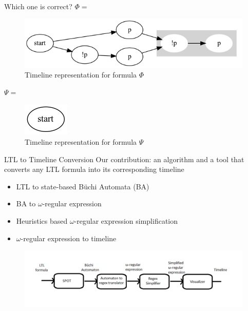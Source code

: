 \documentclass[handout]{beamer}
\newcommand{\Buchi}{B\"{u}chi }
\begin{document}
\begin{frame}{Which one is correct?}
    $\Phi =$
    \begin{figure}
        \centering
        \includegraphics[scale=0.6]{examples/ex2/ex2.gv.png}
        \caption{Timeline representation for formula $\Phi$}
    \end{figure}
    
    $\Psi =$ 
    
   \begin{figure}
        \centering
        \includegraphics[scale=0.6]{examples/ex3/ex3.gv.png}
        \caption{Timeline representation for formula $\Psi$}
    \end{figure}
\end{frame}

\begin{frame}{LTL to Timeline Conversion}
    Our contribution: an algorithm and a tool that converts any LTL formula into its corresponding timeline
    \begin{itemize}
        \item LTL to state-based \Buchi Automata (BA)
        \item BA to $\omega$-regular expression
        \item Heuristics based $\omega$-regular expression simplification
        \item $\omega$-regular expression to timeline
    \end{itemize}
    \begin{figure}
        \centering
        \includegraphics[scale=0.45]{img/algo-flowchart.png}
        \label{fig:my_label}
    \end{figure}
\end{frame}
\end{document}
